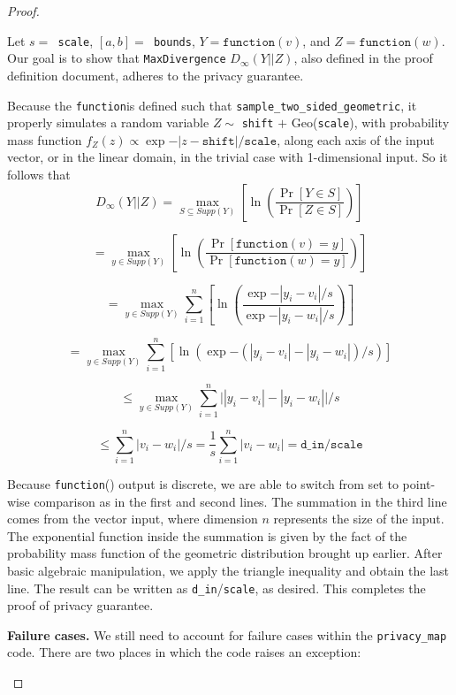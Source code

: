\documentclass[11pt,a4paper]{article}
\newcommand{\function}{\texttt{function}}
\begin{document}
\begin{proof}
\begin{enumerate}
    Let $s=$\texttt{ scale}, $[a,b]=$\texttt{ bounds},
    $Y=\function(v)$, and $Z=\function(w)$.
    Our goal is to show that \texttt{MaxDivergence}  $D_{\infty}(Y||Z)$, also defined in the proof definition document, adheres to the privacy guarantee.
    
    Because the \function is defined such that 
    \texttt{sample\_two\_sided\_geometric}, it properly
    simulates a random variable $Z \sim $ 
    \texttt{shift} $+ 
    \text{ Geo}$(\texttt{scale}), with
    probability mass function
    $f_Z(z)\propto \exp{-|z-\texttt{shift}|/\texttt{scale}}$, along each axis of the input vector, or in the linear domain, in the trivial case with 1-dimensional input.
    So it follows that 
     \[
    D_{\infty}(Y||Z) = \max_{S \subseteq Supp(Y)}\left[\ln (\frac{\Pr[Y \in S]}{\Pr[Z \in S]})\right] 
    \]
    
    \[
    = \max_{y\in Supp(Y)}\left[\ln (\frac{\Pr[
    \function(v) = y]}
    {\Pr[\function(w) = y]})\right]
    \]
    
    \[
    = \max_{y\in Supp(Y)}\sum^n_{i=1}\left[\ln (\frac{\exp{-|y_i-v_i|/s}}
    {\exp{-|y_i-w_i|/s}})\right]
    \]
    
    \[
    = \max_{y\in Supp(Y)}\sum^n_{i=1}\left[\ln (\exp{-(|y_i-v_i|-|y_i-w_i|)/s})\right]
    \]
    
    \[\leq \max_{y\in Supp(Y)}\sum^n_{i=1}\Big|
    |y_i-v_i|-|y_i-w_i|\Big|/s\]
    
    
    \[
    \leq \sum^n_{i=1}|v_i-w_i|/s
    =\frac{1}{s}\sum^n_{i=1}|v_i-w_i|
    =\texttt{d\_in}/\texttt{scale}
    \]
    
 Because \function() output is discrete, we are able to switch from set to point-wise comparison as in the first and second lines. The summation in the third line comes from the vector input, where dimension $n$ represents the size of the input. 
 The exponential function inside the summation is given by the fact of the probability mass function of the geometric distribution 
 brought up earlier. 
After basic algebraic manipulation, we apply the triangle inequality and obtain the last line. The result can be written 
as \texttt{d\_in}/\texttt{scale}, as desired.
This completes the proof of privacy guarantee.
 
 \textbf{Failure cases.} We still need to account for failure cases within the \texttt{privacy\_map} code. There are two places in which the code raises an exception:
 

\end{enumerate}
\end{proof}
\end{document}
